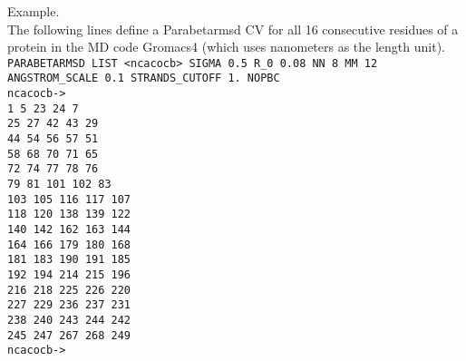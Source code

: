 \documentclass[12pt,fleqn]{report}
\newcommand{\keyword}[1]{\index{Keywords!{\tt #1}} {\tt #1}}
\newcommand{\cv}[1]{\index{Collective variables!{#1}}
\index{{#1}|see{Collective variables, {#1}}} }
\newcommand{\plumed}{{\tt PLUMED}}
\newcommand{\esempio}[1]{
\vspace{10pt}
\begin{flushright}
\colorbox{light-gray}{
   \begin{minipage}{13cm}
       \scriptsize{
{\fontfamily{phv} \fontseries{b}
 \selectfont Example. \\
 \fontseries{m} \selectfont #1 } }
\end{minipage}}
\end{flushright}
\vspace{20pt}
}
\begin{document}
\esempio{The following lines define a Parabetarmsd CV for all 16 consecutive residues of a protein in the MD code Gromacs4
(which uses nanometers as the length unit).
 \vspace{10pt} \\
{\tt PARABETARMSD LIST <ncacocb> SIGMA 0.5 R\_0 0.08 NN 8 MM 12 ANGSTROM\_SCALE 0.1 STRANDS\_CUTOFF 1. NOPBC \\
ncacocb-> \\
    1     5    23    24     7\\
   25    27    42    43    29\\
   44    54    56    57    51\\
   58    68    70    71    65\\
   72    74    77    78    76\\
   79    81   101   102    83\\
  103   105   116   117   107\\
  118   120   138   139   122\\
  140   142   162   163   144\\
  164   166   179   180   168\\
  181   183   190   191   185\\
  192   194   214   215   196\\
  216   218   225   226   220\\
  227   229   236   237   231\\
  238   240   243   244   242\\
  245   247   267   268   249\\
ncacocb-> }}

%
\end{document}
